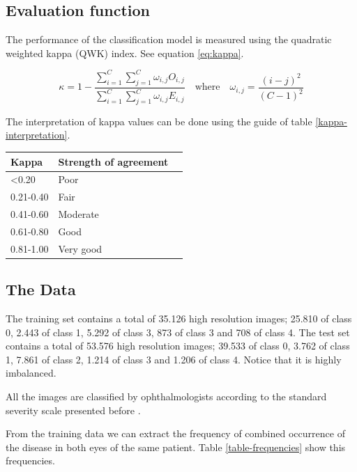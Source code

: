 \documentclass[a0,portrait]{a0poster}
\begin{document}
\begin{multicols}{3}
\subsection*{Evaluation function}

The performance of the classification model is measured using the quadratic weighted kappa  (QWK) index. See equation \ref{eq:kappa}. 

\begin{equation}\label{eq:kappa}
\kappa = 1 - \frac{ \sum_{i=1}^C \sum_{j=1}^C \omega_{i,j} O_{i,j} }
{\sum_{i=1}^C \sum_{j=1}^C  \omega_{i,j} E_{i,j}}
\quad \textrm{where} \quad \omega_{i,j} = \frac{(i-j)^2}{(C - 1)^2}
\end{equation}

The interpretation of kappa values can be done using the guide of table \ref{kappa-interpretation}.

\begin{center}
	\begin{tabular}{llr}
		\hline
		Kappa    & Strength of agreement \\
		\hline
	    \textless 0.20 		& Poor \\
		0.21-0.40 	& Fair \\
		0.41-0.60 	& Moderate \\
		0.61-0.80 	& Good \\
		0.81-1.00 	& Very good \\
		\hline
	\end{tabular}
	\label{kappa-interpretation}
\end{center}

\subsection*{The Data}

The training set contains a total of 35.126 high resolution images; 25.810 of class 0, 2.443 of class 1, 5.292 of class 3, 873 of class 3 and 708 of class 4. The test set contains a total of 53.576 high resolution images; 39.533 of class 0, 3.762 of class 1, 7.861 of class 2, 1.214 of class 3 and 1.206 of class 4. Notice that it is highly imbalanced. 

All the images are classified by ophthalmologists according to the standard severity scale presented before \cite{diaclass}.

From the training data we can extract the frequency of combined occurrence of the disease in both eyes of the same patient. Table \ref{table-frequencies} show this frequencies.


\end{multicols}
\end{document}
